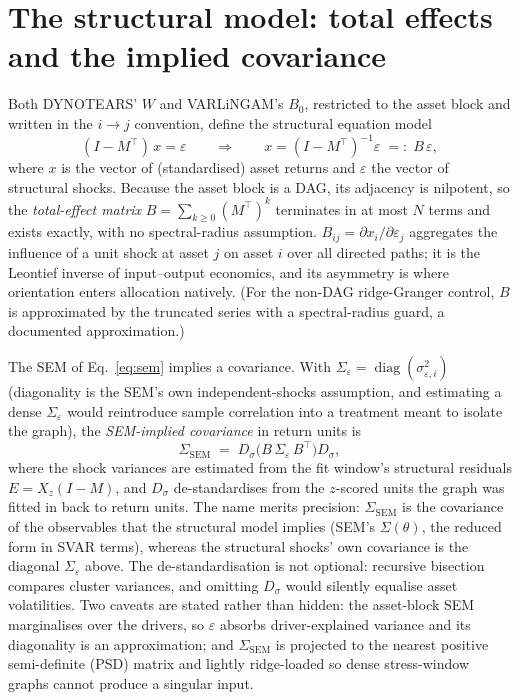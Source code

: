 \section{The structural model: total effects and the implied covariance}
\label{sec:sem}

Both DYNOTEARS' $W$ and VARLiNGAM's $B_0$, restricted to the asset block and
written in the $i\to j$ convention, define the structural equation model
\begin{equation}
  (I - M^\top)\, x = \varepsilon
  \qquad\Longrightarrow\qquad
  x = (I - M^\top)^{-1} \varepsilon \;=:\; B\,\varepsilon,
  \label{eq:sem}
\end{equation}
where $x$ is the vector of (standardised) asset returns and $\varepsilon$ the
vector of structural shocks. Because the asset block is a DAG, its adjacency
is nilpotent, so the \emph{total-effect matrix}
$B = \sum_{k\ge 0} (M^\top)^k$ terminates in at most $N$ terms and exists
exactly, with no spectral-radius assumption. $B_{ij} = \partial x_i / \partial
\varepsilon_j$ aggregates the influence of a unit shock at asset $j$ on asset
$i$ over all directed paths; it is the Leontief inverse of
input--output economics, and its asymmetry is where orientation enters
allocation natively. (For the non-DAG ridge-Granger control, $B$ is approximated
by the truncated series with a spectral-radius guard, a documented
approximation.)

The SEM of Eq.~\eqref{eq:sem} implies a covariance. With $\Sigma_\varepsilon =
\operatorname{diag}(\sigma^2_{\varepsilon,i})$ (diagonality is the SEM's
own independent-shocks assumption, and estimating a dense
$\Sigma_\varepsilon$ would reintroduce sample correlation into a treatment
meant to isolate the graph), the \emph{SEM-implied covariance} in return
units is
\begin{equation}
  \Sigma_{\mathrm{SEM}}
  \;=\; D_\sigma \big( B\, \Sigma_\varepsilon\, B^\top \big) D_\sigma ,
  \label{eq:sigma-sem}
\end{equation}
where the shock variances are estimated from the fit window's structural
residuals $E = X_z (I - M)$, and $D_\sigma$ de-standardises from the
$z$-scored units the graph was fitted in back to return units. The name
merits precision: $\Sigma_{\mathrm{SEM}}$ is the covariance of the
observables that the structural model implies (SEM's $\Sigma(\theta)$,
the reduced form in SVAR terms), whereas the structural shocks' own
covariance is the diagonal $\Sigma_\varepsilon$ above. The
de-standardisation is not optional: recursive bisection compares cluster
variances, and omitting $D_\sigma$ would silently equalise asset
volatilities. Two caveats are stated rather than hidden: the asset-block SEM
marginalises over the drivers, so $\varepsilon$ absorbs driver-explained
variance and its diagonality is an approximation; and
$\Sigma_{\mathrm{SEM}}$ is projected to the nearest positive semi-definite
(PSD) matrix and lightly ridge-loaded
so dense stress-window graphs cannot produce a singular input.

